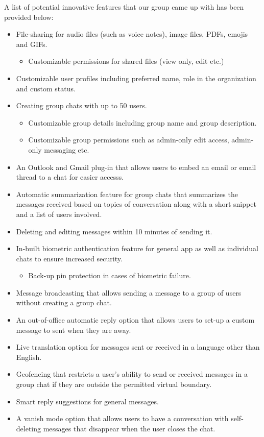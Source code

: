 \documentclass[]{article}
\begin{document}
A list of potential innovative features that our group came up with has been provided below:
\begin{itemize}
	\item File-sharing for audio files (such as voice notes), image files, PDFs, emojis and GIFs.
 	\begin{itemize}
   		\item Customizable permissions for shared files (view only, edit etc.)
     	\end{itemize}
     	\item Customizable user profiles including preferred name, role in the organization and custom status.
      	\item Creating group chats with up to 50 users.
       	\begin{itemize}
		\item Customizable group details including group name and group description.
  		\item Customizable group permissions such as admin-only edit access, admin-only messaging etc.
    	\end{itemize}
     	\item An Outlook and Gmail plug-in that allows users to embed an email or email thread to a chat for easier accesss.
      	\item Automatic summarization feature for group chats that summarizes the messages received based on topics of conversation along with a short snippet and a list of users involved.
	\item Deleting and editing messages within 10 minutes of sending it.
 	\item In-built biometric authentication feature for general app as well as individual chats to ensure increased security.
  	\begin{itemize}
   		\item Back-up pin protection in cases of biometric failure.
     	\end{itemize}
  	\item Message broadcasting that allows sending a message to a group of users without creating a group chat.
   	\item An out-of-office automatic reply option that allows users to set-up a custom message to sent when they are away.
    	\item Live translation option for messages sent or received in a language other than English.
     	\item Geofencing that restricts a user's ability to send or received messages in a group chat if they are outside the permitted virtual boundary.
      	\item Smart reply suggestions for general messages.
       	\item A vanish mode option that allows users to have a conversation with self-deleting messages that disappear when the user closes the chat.
	\end{itemize}
       	
\end{document}
